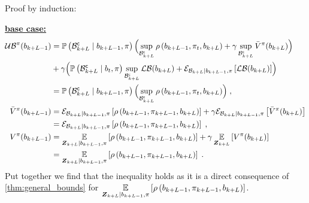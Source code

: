\begin{proofE}
	Proof by induction:

	\textbf{\underline{base case:}}
	\begin{align*}
		\upperbound\nolimits^\pi(\blf{k+L-1})&=\measure{\stcompI{\subSpace}{k+L}\mid\blf{k+L-1},\pi}\Bigl(\sup_{\stcompI{\subSpace}{k+L}}\reward{\blf{k+L-1},\pi_t,\blf{k+L}}+\gamma\sup_{\stcompI{\subSpace}{k+L}}\bar{V}^\pi(\blf{k+L})\Bigr)\\
		&+
		\gamma\Bigl(\measure{\stcompI{\subSpace}{k+L}\mid\blf{t},\pi}\sup_{\stcompI{\subSpace}{k+L}}\lowerbound(\blf{k+L})+\partialexpectation{\lowerbound(\blf{k+L})}{\subSpaceI{k+L}\mid\blf{k+L-1},\pi}\Bigr)\\
		&=\measure{\stcompI{\subSpace}{k+L}\mid\blf{k+L-1},\pi}\Bigl(\sup_{\stcompI{\subSpace}{k+L}}\reward{\blf{k+L-1},\pi_t,\blf{k+L}}\Bigr)\;,\\
		\bar{V}^\pi(\blf{k+L-1}) &=\partialexpectation{\reward{\blf{k+L-1},\pi_{k+L-1},\blf{k+L}}}{\subSpaceI{k+L}\mid\blf{k+L-1},\pi}+\gamma\partialexpectation{\bar{V}^\pi(\blf{k+L})}{\subSpaceI{k+L}\mid\blf{k+L-1},\pi}\\
		&=\partialexpectation{\reward{\blf{k+L-1},\pi_{k+L-1},\blf{k+L}}}{\subSpaceI{k+L}\mid\blf{k+L-1},\pi}\;,\\
		V^\pi(\blf{k+L-1})&=\expectation{\reward{\blf{k+L-1},\pi_{k+L-1},\blf{k+L}}}{\observationsRV{k+L}\mid\blf{k+L-1},\pi}+\gamma\expectation{V^\pi(\blf{k+L})}{\observationsRV{k+L}}\\
		&=\expectation{\reward{\blf{k+L-1},\pi_{k+L-1},\blf{k+L}}}{\observationsRV{k+L}\mid\blf{k+L-1},\pi}\;.
	\end{align*}
	Put together we find that the inequality holds as it is a direct consequence of \cref{thm:general_bounds} for $\expectation{\reward{\blf{k+L-1},\pi_{k+L-1},\blf{k+L}}}{\observationsRV{k+L}\mid\blf{k+L-1},\pi}$.


\end{proofE}
